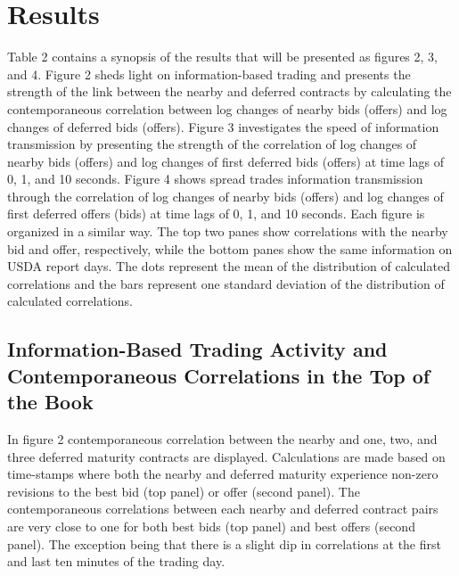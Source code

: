 \documentclass[]{elsarticle} %
\begin{document}
\section{Results}\label{results}

Table 2 contains a synopsis of the results that will be presented as
figures 2, 3, and 4. Figure 2 sheds light on information-based trading
and presents the strength of the link between the nearby and deferred
contracts by calculating the contemporaneous correlation between log
changes of nearby bids (offers) and log changes of deferred bids
(offers). Figure 3 investigates the speed of information transmission by
presenting the strength of the correlation of log changes of nearby bids
(offers) and log changes of first deferred bids (offers) at time lags of
0, 1, and 10 seconds. Figure 4 shows spread trades information
transmission through the correlation of log changes of nearby bids
(offers) and log changes of first deferred offers (bids) at time lags of
0, 1, and 10 seconds. Each figure is organized in a similar way. The top
two panes show correlations with the nearby bid and offer, respectively,
while the bottom panes show the same information on USDA report days.
The dots represent the mean of the distribution of calculated
correlations and the bars represent one standard deviation of the
distribution of calculated correlations.

\subsection{Information-Based Trading Activity and Contemporaneous
Correlations in the Top of the
Book}\label{information-based-trading-activity-and-contemporaneous-correlations-in-the-top-of-the-book-1}

In figure 2 contemporaneous correlation between the nearby and one, two,
and three deferred maturity contracts are displayed. Calculations are
made based on time-stamps where both the nearby and deferred maturity
experience non-zero revisions to the best bid (top panel) or offer
(second panel). The contemporaneous correlations between each nearby and
deferred contract pairs are very close to one for both best bids (top
panel) and best offers (second panel). The exception being that there is
a slight dip in correlations at the first and last ten minutes of the
trading day.
\end{document}
